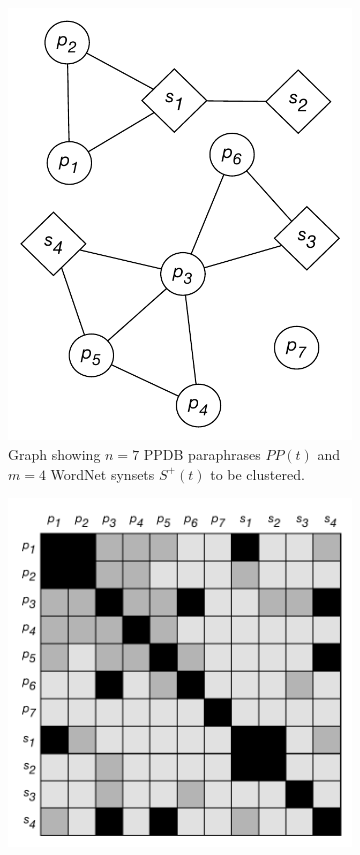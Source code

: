\documentclass[11pt]{article}
\begin{document}
\begin{figure}[th]
	\begin{subfigure}[t]{0.25\textwidth}
		\includegraphics[width=\textwidth]{images/pp_syn_graph.pdf}
		\caption{Graph showing $n=7$ PPDB paraphrases $PP(t)$ and $m=4$ WordNet synsets $S^+(t)$ to be clustered.}
		\label{fig:ppsyngraph}
	\end{subfigure}
	\hfill%
	\begin{subfigure}[t]{0.36\textwidth}
		\includegraphics[width=\textwidth]{images/pp_syn_mat_all.pdf}

\end{subfigure}
\end{figure}
\end{document}
